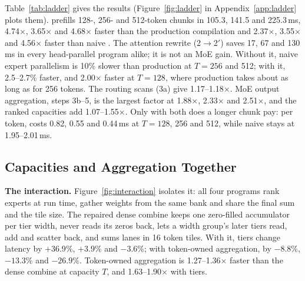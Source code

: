 Table~\ref{tab:ladder} gives the results (Figure~\ref{fig:ladder} in Appendix~\ref{app:ladder} plots them). \sys prefills
128-, 256- and 512-token chunks in 105.3, 141.5 and 225.3\,ms, 4.74$\times$, 3.65$\times$ and 4.68$\times$ faster than the production
compilation and 2.37$\times$, 3.55$\times$ and 4.56$\times$ faster than naive \naive. The attention rewrite (2$\to$2$'$)
saves 17, 67 and 130\,ms in every head-parallel program alike; it is not an MoE gain. Without it, naive expert parallelism
is 10\% slower than production at $T=256$ and 512; with it, 2.5--2.7\% faster, and 2.00$\times$ faster at $T=128$, where
production takes about as long as for 256 tokens. The routing scans (3a)
give 1.17--1.18$\times$. MoE output aggregation, steps 3b--5, is the largest factor at 1.88$\times$, 2.33$\times$ and
2.51$\times$, and the ranked capacities add 1.07--1.55$\times$. Only with both does a longer chunk pay: per token, \sys costs
0.82, 0.55 and 0.44\,ms at $T=128$, 256 and 512, while naive \naive stays at 1.95--2.01\,ms.

\subsection{Capacities and Aggregation Together}
\label{sec:eval-abl}

\textbf{The interaction.} Figure~\ref{fig:interaction} isolates it: all four programs rank experts at run time, gather
weights from the same bank and share the final sum and the tile size. The repaired dense combine keeps one zero-filled
accumulator per tier width, never reads its zeros back, lets a width group's later tiers read, add and scatter back, and
sums lanes in 16 token tiles. With it, tiers change latency by $+36.9\%$, $+3.9\%$ and $-3.6\%$; with token-owned
aggregation, by $-8.8\%$, $-13.3\%$ and $-26.9\%$. Token-owned aggregation is 1.27--1.36$\times$ faster than the dense
combine at capacity $T$, and 1.63--1.90$\times$ with tiers.

